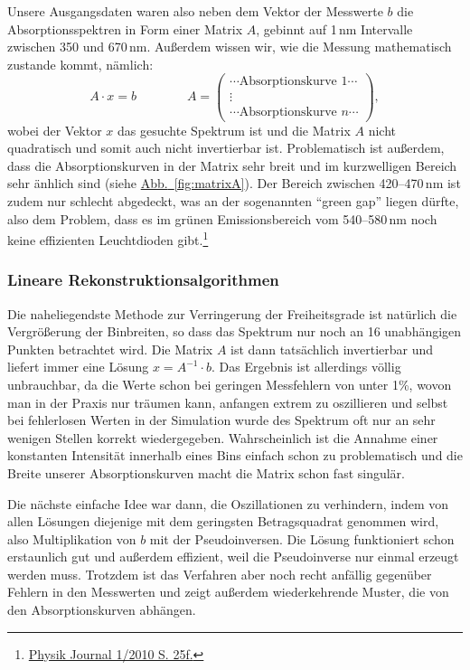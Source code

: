 \documentclass[11pt]{scrartcl}
\newcommand{\hypref}[2]{\hyperref[#2]{{#1}~\ref{#2}}}
\begin{document}
Unsere Ausgangsdaten waren also neben dem Vektor der Messwerte $b$ die Absorptionsspektren in Form einer Matrix $A$, gebinnt auf 1\,nm Intervalle zwischen 350 und 670\,nm. Außerdem wissen wir, wie die Messung mathematisch zustande kommt, nämlich:
\begin{equation}
A\cdot x = b
\qquad\qquad
A =
\begin{pmatrix}
\cdots \text{Absorptionskurve 1} \cdots \\
\vdots \\
\cdots \text{Absorptionskurve $n$} \cdots
\end{pmatrix},
\end{equation}
wobei der Vektor $x$ das gesuchte Spektrum ist und die Matrix $A$ nicht quadratisch und somit auch nicht invertierbar ist.
Problematisch ist außerdem, dass die Absorptionskurven in der Matrix sehr breit und im kurzwelligen Bereich sehr änhlich sind (siehe \hypref{Abb.}{fig:matrixA}).
Der Bereich zwischen 420--470\,nm ist zudem nur schlecht abgedeckt, was an der sogenannten "`green gap"' liegen dürfte, also dem Problem, dass es im grünen Emissionsbereich vom 540--580\,nm noch keine effizienten Leuchtdioden gibt.\footnote{\href{http://www.pro-physik.de/Phy/pdfstart.do?mid=3\&articleid=51055\&recordid=51193}{Physik Journal 1/2010 S. 25f.}}

\subsubsection{Lineare Rekonstruktionsalgorithmen}
Die naheliegendste Methode zur Verringerung der Freiheitsgrade ist natürlich die Vergrößerung der Binbreiten, so dass das Spektrum nur noch an 16 unabhängigen Punkten betrachtet wird.
Die Matrix $A$ ist dann tatsächlich invertierbar und liefert immer eine Lösung $x = A^{-1}\cdot b$.
Das Ergebnis ist allerdings völlig unbrauchbar, da die Werte schon bei geringen Messfehlern von unter 1\%, wovon man in der Praxis nur träumen kann, anfangen extrem zu oszillieren und selbst bei fehlerlosen Werten in der Simulation wurde des Spektrum oft nur an sehr wenigen Stellen korrekt wiedergegeben.
Wahrscheinlich ist die Annahme einer konstanten Intensität innerhalb eines Bins einfach schon zu problematisch und die Breite unserer Absorptionskurven macht die Matrix schon fast singulär.

Die nächste einfache Idee war dann, die Oszillationen zu verhindern, indem von allen Lösungen diejenige mit dem geringsten Betragsquadrat genommen wird, also Multiplikation von $b$ mit der Pseudoinversen.
Die Lösung funktioniert schon erstaunlich gut und außerdem effizient, weil die Pseudoinverse nur einmal erzeugt werden muss.
Trotzdem ist das Verfahren aber noch recht anfällig gegenüber Fehlern in den Messwerten und zeigt außerdem wiederkehrende Muster, die von den Absorptionskurven abhängen.
\end{document}
